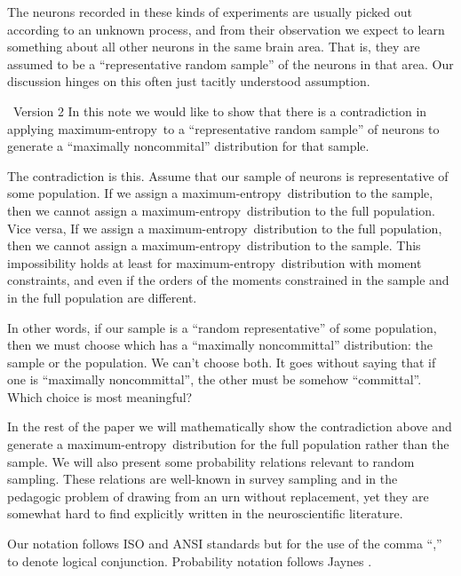 \documentclass{article}
\theoremstyle{remark}
\theoremstyle{innote}
\newcommand*{\citep}{\parencites}
\renewcommand*{\|}{\mathpunct{|}}%
\theoremstyle{simple}
\newcommand*{\puzzle}{{\fontencoding{U}\fontfamily{fontawesometwo}\selectfont\symbol{225}}}
\newcommand*{\mynote}[1]{ {\color{notecolour}\puzzle\ #1}}
\newcommand*{\me}{maximum-entropy}
\begin{document}
The neurons recorded in these kinds of experiments are usually picked out
according to an unknown process, and from their observation we expect to
learn something about all other neurons in the same brain area. That is,
they are assumed to be a \enquote{representative random sample} of the
neurons in that area. Our discussion hinges on this often just tacitly
understood assumption.


\mynote{Version 2 }
In this note we would like to show that there is a
contradiction in applying \me\ to a \enquote{representative random sample}
of neurons to generate a \enquote{maximally noncommital} distribution for
that sample.

The contradiction is this. Assume that our sample of neurons is
representative of some population. If we assign a \me\ distribution to the
sample, then we cannot assign a \me\ distribution to the full population.
Vice versa, If we assign a \me\ distribution to the full population, then
we cannot assign a \me\ distribution to the sample. This impossibility
holds at least for \me\ distribution with moment constraints, and even if
the orders of the moments constrained in the sample and in the full
population are different.

In other words, if our sample is a \enquote{random representative} of some
population, then we must choose which has a \enquote{maximally
  noncommittal} distribution: the sample or the population. We can't choose
both. It goes without saying that if one is \enquote{maximally
  noncommittal}, the other must be somehow \enquote{committal}. Which
choice is most meaningful?

In the rest of the paper we will mathematically show the contradiction
above and generate a \me\ distribution for the full population rather than
the sample. We will also present some probability relations relevant to
random sampling. These relations are well-known in survey sampling and in
the pedagogic problem of drawing from an urn without replacement, yet they
are somewhat hard to find explicitly written in the neuroscientific
literature.

Our notation follows ISO and ANSI standards
\citep{iso1993,ieee1993,nist1995} but for the use of the comma \enquote{,}
to denote logical conjunction. Probability notation follows Jaynes
\citep{jaynes1994_r2003}.
\end{document}
